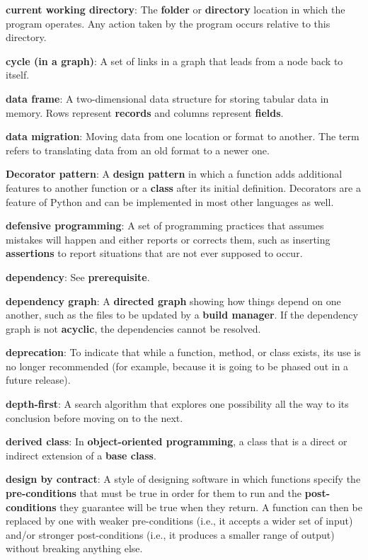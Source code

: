 \documentclass[krantzl]{krantz}
\newcommand{\glosskey}[1]{\textbf{#1}}
\begin{document}
\noindent \textbf{\glosskey{current working directory}}: 
The \glosskey{folder} or \glosskey{directory} location in which the program operates. Any action taken by the program occurs relative to this directory.


\noindent \textbf{\glosskey{cycle (in a graph)}}: 
A set of links in a graph that leads from a node back to itself.


\noindent \textbf{\glosskey{data frame}}: 
A two-dimensional data structure for storing tabular data in memory. Rows represent \glosskey{records} and columns represent \glosskey{fields}.


\noindent \textbf{\glosskey{data migration}}: 
Moving data from one location or format to another. The term refers to translating data from an old format to a newer one.


\noindent \textbf{\glosskey{Decorator pattern}}: 
A \glosskey{design pattern} in which a function adds additional features to another function or a \glosskey{class} after its initial definition. Decorators are a feature of Python and can be implemented in most other languages as well.


\noindent \textbf{\glosskey{defensive programming}}: 
A set of programming practices that assumes mistakes will happen and either reports or corrects them, such as inserting \glosskey{assertions} to report situations that are not ever supposed to occur.


\noindent \textbf{\glosskey{dependency}}: 
See \glosskey{prerequisite}.


\noindent \textbf{\glosskey{dependency graph}}: 
A \glosskey{directed graph} showing how things depend on one another, such as the files to be updated by a \glosskey{build manager}. If the dependency graph is not \glosskey{acyclic}, the dependencies cannot be resolved.


\noindent \textbf{\glosskey{deprecation}}: 
To indicate that while a function, method, or class exists, its use is no longer recommended (for example, because it is going to be phased out in a future release).


\noindent \textbf{\glosskey{depth-first}}: 
A search algorithm that explores one possibility all the way to its conclusion before moving on to the next.


\noindent \textbf{\glosskey{derived class}}: 
In \glosskey{object-oriented programming}, a class that is a direct or indirect extension of a \glosskey{base class}.


\noindent \textbf{\glosskey{design by contract}}: 
A style of designing software in which functions specify the \glosskey{pre-conditions} that must be true in order for them to run and the \glosskey{post-conditions} they guarantee will be true when they return. A function can then be replaced by one with weaker pre-conditions (i.e., it accepts a wider set of input) and/or stronger post-conditions (i.e., it produces a smaller range of output) without breaking anything else.
\end{document}
